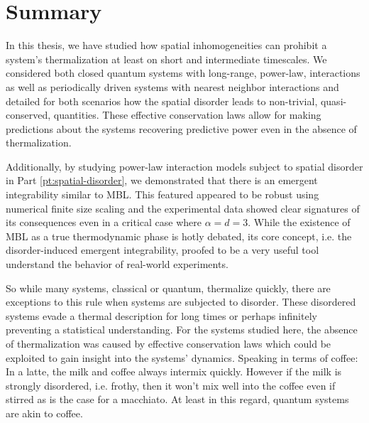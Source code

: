 \chapter*{Summary}
\label{pt:summary}
In this thesis, we have studied how spatial inhomogeneities can prohibit a system's thermalization at least on short and intermediate timescales. We considered both closed quantum systems with long-range, power-law, interactions as well as periodically driven systems with nearest neighbor interactions and detailed for both scenarios how the spatial disorder leads to non-trivial, quasi-conserved, quantities. These effective conservation laws allow for making predictions about the systems recovering predictive power even in the absence of thermalization.


Additionally, by studying power-law interaction models subject to spatial disorder in Part \ref{pt:spatial-disorder}, we demonstrated that there is an emergent integrability similar to MBL. This featured appeared to be robust using numerical finite size scaling and the experimental data showed clear signatures of its consequences even in a critical case where $\alpha=d=3$. While the existence of MBL as a true thermodynamic phase is hotly debated, its core concept, i.e. the disorder-induced emergent integrability, proofed to be a very useful tool understand the behavior of real-world experiments. 

So while many systems, classical or quantum, thermalize quickly, there are exceptions to this rule when systems are subjected to disorder. These disordered systems evade a thermal description for long times or perhaps infinitely preventing a statistical understanding. For the systems studied here, the absence of thermalization was caused by effective conservation laws which could be exploited to gain insight into the systems' dynamics.
Speaking in terms of coffee: In a latte, the milk and coffee always intermix quickly. However if the milk is strongly
disordered, i.e. frothy, then it won't mix well into the coffee even if stirred  as is the case for a macchiato. At least in this regard, quantum systems are akin to coffee.

%
%


